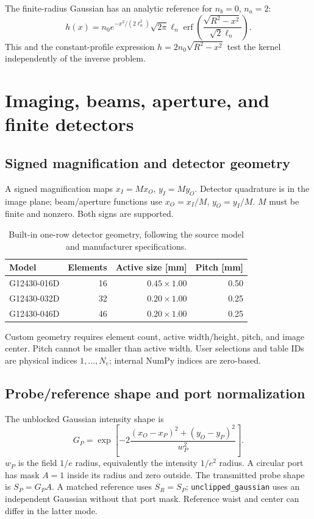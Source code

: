 \documentclass[11pt,letterpaper]{article}
\newcommand{\code}[1]{\nolinkurl{#1}}
\begin{document}
The finite-radius Gaussian has an analytic reference for $n_b=0$, $n_a=2$:
\begin{equation}
h(x)=n_0 e^{-x^2/(2\ell_n^2)}\sqrt{2\pi}\ell_n
\operatorname{erf}\left(\frac{\sqrt{R^2-x^2}}{\sqrt{2}\ell_n}\right).
\label{eq:gaussian-abel}
\end{equation}
This and the constant-profile expression $h=2n_0\sqrt{R^2-x^2}$ test the kernel
independently of the inverse problem.

\section{Imaging, beams, aperture, and finite detectors}
\subsection{Signed magnification and detector geometry}
A signed magnification maps $x_I=Mx_O$, $y_I=My_O$. Detector quadrature is in
the image plane; beam/aperture functions use $x_O=x_I/M$, $y_O=y_I/M$.
$M$ must be finite and nonzero. Both signs are supported.

\begin{table}[tbp]\centering
\caption{Built-in one-row detector geometry, following the source model and manufacturer specifications.}
\begin{tabular}{lrrr}\toprule
Model & Elements & Active size [mm] & Pitch [mm]\\\midrule
G12430-016D & 16 & $0.45\times1.00$ & 0.50\\
G12430-032D & 32 & $0.20\times1.00$ & 0.25\\
G12430-046D & 46 & $0.20\times1.00$ & 0.25\\\bottomrule
\end{tabular}\end{table}
Custom geometry requires element count, active width/height, pitch, and image
center. Pitch cannot be smaller than active width. User selections and table
IDs are physical indices $1,\ldots,N_e$; internal NumPy indices are zero-based.

\subsection{Probe/reference shape and port normalization}
The unblocked Gaussian intensity shape is
\begin{equation}
G_P=\exp\left[-2\frac{(x_O-x_P)^2+(y_O-y_P)^2}{w_P^2}\right].
\end{equation}
$w_P$ is the field $1/e$ radius, equivalently the intensity $1/e^2$ radius.
A circular port has mask $A=1$ inside its radius and zero outside.
The transmitted probe shape is $S_P=G_PA$. A matched reference uses
$S_R=S_P$; \code{unclipped_gaussian} uses an independent Gaussian without
that port mask. Reference waist and center can differ in the latter mode.
\end{document}
